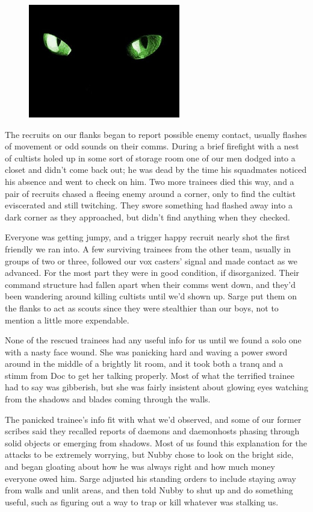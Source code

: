 \begin{figure}
	\begin{center}
		\includegraphics[width=\figwidth]{pics/8/39.png}
	\end{center}
\end{figure}
The recruits on our flanks began to report possible enemy contact, usually flashes of movement or odd sounds on their comms. 
During a brief firefight with a nest of cultists holed up in some sort of storage room one of our men dodged into a closet and didn’t come back out; 
he was dead by the time his squadmates noticed his absence and went to check on him. 
Two more trainees died this way, and a pair of recruits chased a fleeing enemy around a corner, only to find the cultist eviscerated and still twitching. 
They swore something had flashed away into a dark corner as they approached, but didn’t find anything when they checked.

Everyone was getting jumpy, and a trigger happy recruit nearly shot the first friendly we ran into. 
A few surviving trainees from the other team, usually in groups of two or three, followed our vox casters’ signal and made contact as we advanced. 
For the most part they were in good condition, if disorganized. 
Their command structure had fallen apart when their comms went down, and they’d been wandering around killing cultists until we’d shown up. 
Sarge put them on the flanks to act as scouts since they were stealthier than our boys, not to mention a little more expendable.

None of the rescued trainees had any useful info for us until we found a solo one with a nasty face wound. 
She was panicking hard and waving a power sword around in the middle of a brightly lit room, and 
it took both a tranq and a stimm from Doc to get her talking properly. 
Most of what the terrified trainee had to say was gibberish, but she was fairly insistent about glowing eyes watching from the shadows and blades coming through the walls.

The panicked trainee’s info fit with what we’d observed, and some of our former scribes said they recalled reports of daemons and daemonhosts phasing through solid objects or emerging from shadows. 
Most of us found this explanation for the attacks to be extremely worrying, but Nubby chose to look on the bright side, and began gloating about how he was always right and how much money everyone owed him. 
Sarge adjusted his standing orders to include staying away from walls and unlit areas, and then told Nubby to shut up and do something useful, such as figuring out a way to trap or kill whatever was stalking us.

